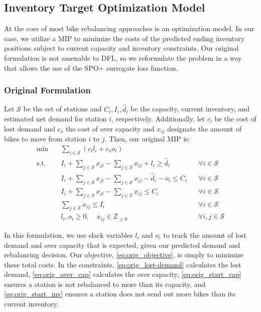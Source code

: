 \documentclass{article}
\begin{document}
\subsection{Inventory Target Optimization Model}
At the core of most bike rebalancing approaches is an optimization model. In our case, we utilize a MIP to minimize the costs of the predicted ending inventory positions subject to current capacity and inventory constraints. Our original formulation is not amenable to DFL, so we reformulate the problem in a way that allows 
the use of the SPO+ surrogate loss function.

\subsubsection{Original Formulation}
Let $\mathcal{S}$ be the set of stations and $C_i, I_i, \hat{d}_i$ be the capacity, current inventory, and estimated net demand for station $i$, respectively. Additionally, let $c_l$ be the cost of lost demand and $c_o$ the cost of over capacity and $x_{ij}$ designate the amount of bikes to move from station $i$ to $j$. 
Then, our original MIP is:
\begin{align}
\min \quad & \sum_{i \in \mathcal{S}} (c_l l_i + c_o o_i) \label{eq:orig_objective} \\
\text{s.t.} \quad & I_i + \sum_{j \in \mathcal{S}} x_{ji} - \sum_{j \in \mathcal{S}} x_{ij} + l_i \geq \hat{d}_i && \forall i \in \mathcal{S}\label{eq:orig_lost-demand} \\
& I_i + \sum_{j \in \mathcal{S}} x_{ji} - \sum_{j \in \mathcal{S}} x_{ij} - \hat{d}_i - o_i \leq C_i && \forall i \in \mathcal{S} \label{eq:orig_over_cap} \\
& I_i + \sum_{j \in \mathcal{S}} x_{ji} - \sum_{j \in \mathcal{S}} x_{ij} \leq C_i && \forall i \in \mathcal{S} \label{eq:orig_start_cap} \\
& \sum_{j \in \mathcal{S}} x_{ij} \leq I_i && \forall i \in \mathcal{S} \label{eq:orig_start_inv} \\
& l_i, o_i \geq 0, \quad x_{ij} \in \mathbb{Z}_{\geq 0} && \forall i, j \in \mathcal{S} \nonumber
\end{align}

In this formulation, we use slack variables $l_i$ and $o_i$ to track the amount of lost demand and over capacity that is expected, given our predicted demand and rebalancing decision. Our objective, \cref{eq:orig_objective}, is simply to minimize these total costs. In the constraints, \cref{eq:orig_lost-demand} calculates the lost demand, 
\cref{eq:orig_over_cap} calculates the over capacity, \cref{eq:orig_start_cap} ensures a station is not rebalanced to more than its capacity, and \cref{eq:orig_start_inv} ensures a station does not send out more bikes than its current inventory.
\end{document}
